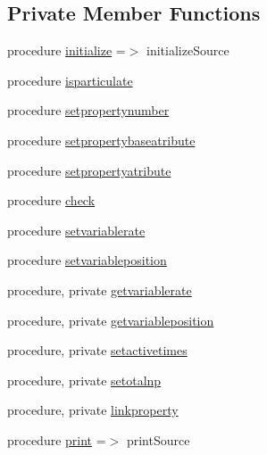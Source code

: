 \subsection*{Private Member Functions}
\begin{DoxyCompactItemize}
\item 
procedure \mbox{\hyperlink{structsources__mod_1_1source__class_a996650639d039c09d2b77a36473e977e}{initialize}} =$>$ initialize\+Source
\item 
procedure \mbox{\hyperlink{structsources__mod_1_1source__class_aa0577157bf75a525f9e1bde905500ab7}{isparticulate}}
\item 
procedure \mbox{\hyperlink{structsources__mod_1_1source__class_a01963a01bece671c1ae69bc50eb7870a}{setpropertynumber}}
\item 
procedure \mbox{\hyperlink{structsources__mod_1_1source__class_a1764cde0d33c1a8d2c22f784e1d139d7}{setpropertybaseatribute}}
\item 
procedure \mbox{\hyperlink{structsources__mod_1_1source__class_a248ab2049b6b36680b88e49e752f7400}{setpropertyatribute}}
\item 
procedure \mbox{\hyperlink{structsources__mod_1_1source__class_acbed40c917e4dacc0cd9dd7931e27839}{check}}
\item 
procedure \mbox{\hyperlink{structsources__mod_1_1source__class_ac417ca6bfe88767ed46df5ac9cbddb5e}{setvariablerate}}
\item 
procedure \mbox{\hyperlink{structsources__mod_1_1source__class_a5fa6d00f8e538706a32aec03678c19f7}{setvariableposition}}
\item 
procedure, private \mbox{\hyperlink{structsources__mod_1_1source__class_a827fe10eff070db060bcb7a9c548fb30}{getvariablerate}}
\item 
procedure, private \mbox{\hyperlink{structsources__mod_1_1source__class_a45883b34c6cfb46a94f7c9638be2ca39}{getvariableposition}}
\item 
procedure, private \mbox{\hyperlink{structsources__mod_1_1source__class_a8fa0cd13731590a871e33801f32f0579}{setactivetimes}}
\item 
procedure, private \mbox{\hyperlink{structsources__mod_1_1source__class_a6098dbb749bed525919e6370aed70ef9}{setotalnp}}
\item 
procedure, private \mbox{\hyperlink{structsources__mod_1_1source__class_a58282637980cd13f683be32cb57dc227}{linkproperty}}
\item 
procedure \mbox{\hyperlink{structsources__mod_1_1source__class_af632299e6c5e29a7f2008417aa68d529}{print}} =$>$ print\+Source
\end{DoxyCompactItemize}

